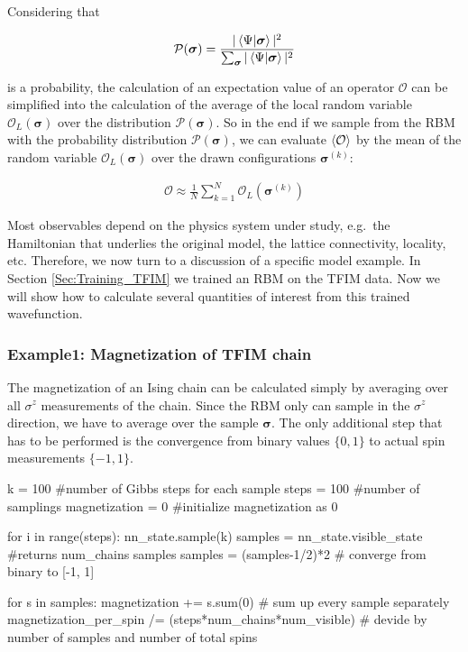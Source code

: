 \documentclass[submission, Phys]{SciPost}
\begin{document}
Considering that

\begin{equation}
\mathcal{P}({\bm{\sigma}}) = \frac{ | \braket{\Psi | {\bm{\sigma}}} |^2  }{\sum_{\bm{\sigma}}  | \braket{\Psi | {\bm{\sigma}}} |^2} 
\end{equation}

is a probability, the calculation of an expectation value of an operator $\mathcal{O}$ can be simplified into the calculation of  the average of the local random variable $\mathcal{O}_L({\bm{\sigma}})$ over the distribution $\mathcal{P}({\bm{\sigma}})$.
So in the end if we sample from the RBM with the probability distribution $\mathcal{P}({\bm{\sigma}})$, we can evaluate $\braket{\mathcal{O}}$ by the mean of the random variable $\mathcal{O}_L({\bm{\sigma}})$ over the drawn configurations ${\bm{\sigma}^{(k)}}$:

\begin{align}
\label{Eq:}
\mathcal{O} \approx \frac{1}{N} \sum_{k=1}^N \mathcal{O}_L({\bm{\sigma}}^{(k)})
\end{align}

Most observables depend on the physics system under study, e.g.~the Hamiltonian that underlies the original model, the lattice connectivity, locality, etc.  Therefore, we now turn to a discussion of a specific model example. In Section \ref{Sec:Training_TFIM} we trained an RBM on the TFIM data. Now we will show how to calculate several quantities of interest from this trained wavefunction.

\subsubsection{Example1: Magnetization of TFIM chain}

The magnetization of an Ising chain can be calculated simply by averaging over all $\sigma^z$ measurements of the chain. Since the RBM only can sample in the $\sigma^z$ direction, we have to average over the sample $\bm{\sigma}$. The only additional step that has to be performed is the convergence from binary values $\{0,1  \}$ to actual spin measurements $\{-1 ,1  \}$.

\begin{python}
k = 100 #number of Gibbs steps for each sample
steps = 100 #number of samplings
magnetization = 0 #initialize magnetization as 0

for i in range(steps):
	nn_state.sample(k)
	samples = nn_state.visible_state #returns num_chains samples
	samples = (samples-1/2)*2 # converge from binary to [-1, 1]

	for s in samples: 
		magnetization += s.sum(0) # sum up every sample separately
magnetization_per_spin /= (steps*num_chains*num_visible) # devide by number of samples and number of total spins
\end{python}
\end{document}
